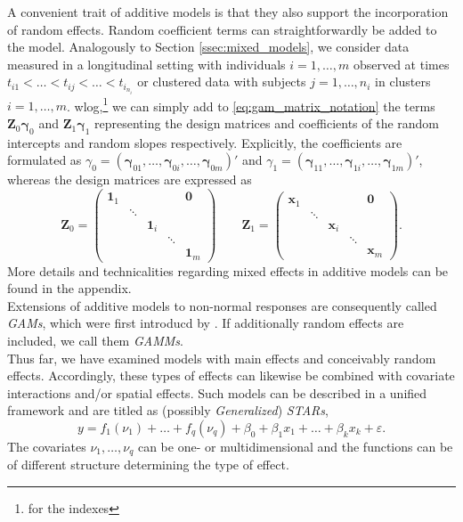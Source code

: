 A convenient trait of additive models is that they also support the incorporation of random effects. Random coefficient terms can straightforwardly be added to the model.
Analogously to Section \ref{ssec:mixed_models}, we consider data measured in a longitudinal setting with individuals  $i=1, \ldots, m$ observed at times $t_{i1} < \ldots < t_{ij} < \ldots < t_{i_{n_i}}$ or clustered data with subjects $j=1, \ldots, n_i$ in clusters $i=1, \ldots, m$. \Ac{wlog},\footnote{for the indexes} we can simply add to \autoref{eq:gam_matrix_notation} the terms $\bm{Z}_0 \bm{\gamma}_0$ and $\bm{Z}_1 \bm{\gamma}_1$ representing the design matrices and coefficients of the random intercepts and random slopes respectively. Explicitly, the coefficients are formulated as $\gamma_{0}=\left(\bm{\gamma}_{01}, \ldots, \bm{\gamma}_{0 i}, \ldots, \bm{\gamma}_{0 m}\right)'$ and $\gamma_{1}=\left(\bm{\gamma}_{11}, \ldots, \bm{\gamma}_{1 i}, \ldots, \bm{\gamma}_{1 m}\right)'$, whereas the design matrices are expressed as
$$
\bm{Z}_0 =
\left(
\begin{matrix}
\bm{1}_1 &  &  &  & \bm{0} \\ 
 & \ddots &  &  &  \\ 
 &  & \bm{1}_i &  &  \\ 
 &  &  & \ddots &  \\ 
 &  &  &  & \bm{1}_m
\end{matrix} 
\right)
\qquad
\bm{Z}_1 =
\left(
\begin{matrix}
\bm{x}_1 &  &  &  & \bm{0} \\ 
 & \ddots &  &  &  \\ 
 &  & \bm{x}_i &  &  \\ 
 &  &  & \ddots &  \\ 
 &  &  &  & \bm{x}_m
\end{matrix} 
\right).
$$
More details and technicalities regarding mixed effects in additive models can be found in the appendix.\\


Extensions of additive models to non-normal responses are consequently called \textit{\acp{GAM}}, which were first introducd by \cite{hastie1986}. If additionally random effects are included, we call them \textit{\acp{GAMM}}.\\

Thus far, we have examined models with main effects and conceivably random effects. Accordingly, these types of effects can likewise be combined with covariate interactions and/or spatial effects. Such models can be described in a unified framework and are titled as (possibly \textit{Generalized}) \textit{\acp{STAR}},
$$
y=f_{1}\left(\nu_{1}\right)+\ldots+f_{q}\left(\nu_{q}\right)+\beta_{0}+\beta_{1} x_{1}+\ldots+\beta_{k} x_{k}+\varepsilon.
$$
The covariates $\nu_1, \ldots, \nu_q$ can be one- or multidimensional and the functions can be of different structure determining the type of effect.




